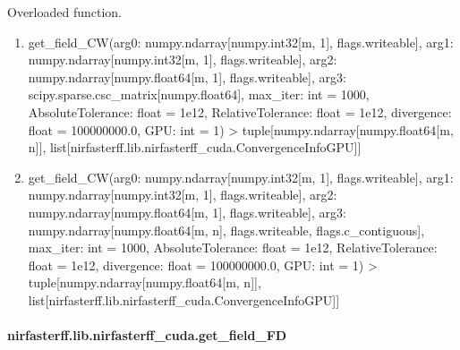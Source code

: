 \documentclass[letterpaper,10pt,english]{sphinxmanual}
\begin{document}
\begin{fulllineitems}
\label{\detokenize{_autosummary/nirfasterff.lib.nirfasterff_cuda.get_field_CW:nirfasterff.lib.nirfasterff_cuda.get_field_CW}}
\pysigstartsignatures
{}
\pysigstopsignatures
\sphinxAtStartPar
Overloaded function.
\begin{enumerate}
%
\item {} 
\sphinxAtStartPar
get\_field\_CW(arg0: numpy.ndarray{[}numpy.int32{[}m, 1{]}, flags.writeable{]}, arg1: numpy.ndarray{[}numpy.int32{[}m, 1{]}, flags.writeable{]}, arg2: numpy.ndarray{[}numpy.float64{[}m, 1{]}, flags.writeable{]}, arg3: scipy.sparse.csc\_matrix{[}numpy.float64{]}, max\_iter: int = 1000, AbsoluteTolerance: float = 1e\sphinxhyphen{}12, RelativeTolerance: float = 1e\sphinxhyphen{}12, divergence: float = 100000000.0, GPU: int = \sphinxhyphen{}1) \sphinxhyphen{}\textgreater{} tuple{[}numpy.ndarray{[}numpy.float64{[}m, n{]}{]}, list{[}nirfasterff.lib.nirfasterff\_cuda.ConvergenceInfoGPU{]}{]}

\item {} 
\sphinxAtStartPar
get\_field\_CW(arg0: numpy.ndarray{[}numpy.int32{[}m, 1{]}, flags.writeable{]}, arg1: numpy.ndarray{[}numpy.int32{[}m, 1{]}, flags.writeable{]}, arg2: numpy.ndarray{[}numpy.float64{[}m, 1{]}, flags.writeable{]}, arg3: numpy.ndarray{[}numpy.float64{[}m, n{]}, flags.writeable, flags.c\_contiguous{]}, max\_iter: int = 1000, AbsoluteTolerance: float = 1e\sphinxhyphen{}12, RelativeTolerance: float = 1e\sphinxhyphen{}12, divergence: float = 100000000.0, GPU: int = \sphinxhyphen{}1) \sphinxhyphen{}\textgreater{} tuple{[}numpy.ndarray{[}numpy.float64{[}m, n{]}{]}, list{[}nirfasterff.lib.nirfasterff\_cuda.ConvergenceInfoGPU{]}{]}

\end{enumerate}

\end{fulllineitems}


\sphinxstepscope


\paragraph{nirfasterff.lib.nirfasterff\_cuda.get\_field\_FD}
\label{\detokenize{_autosummary/nirfasterff.lib.nirfasterff_cuda.get_field_FD:nirfasterff-lib-nirfasterff-cuda-get-field-fd}}\label{\detokenize{_autosummary/nirfasterff.lib.nirfasterff_cuda.get_field_FD::doc}}
\end{document}
